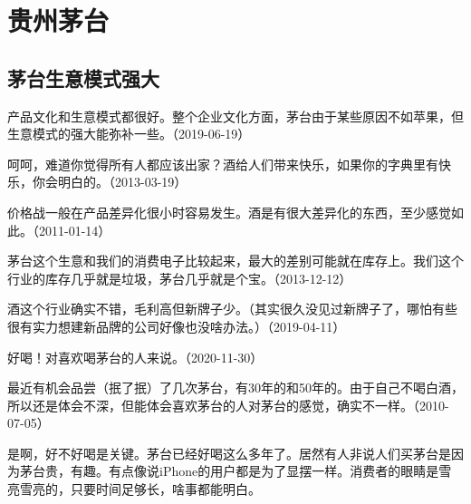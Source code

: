 
\section{贵州茅台}

\subsection{茅台生意模式强大}


产品文化和生意模式都很好。整个企业文化方面，茅台由于某些原因不如苹果，但生意模式的强大能弥补一些。（2019-06-19）


呵呵，难道你觉得所有人都应该出家？酒给人们带来快乐，如果你的字典里有快乐，你会明白的。（2013-03-19）

价格战一般在产品差异化很小时容易发生。酒是有很大差异化的东西，至少感觉如此。（2011-01-14）


茅台这个生意和我们的消费电子比较起来，最大的差别可能就在库存上。我们这个行业的库存几乎就是垃圾，茅台几乎就是个宝。（2013-12-12）


酒这个行业确实不错，毛利高但新牌子少。（其实很久没见过新牌子了，哪怕有些很有实力想建新品牌的公司好像也没啥办法。）（2019-04-11）


好喝！对喜欢喝茅台的人来说。（2020-11-30）

最近有机会品尝（抿了抿）了几次茅台，有30年的和50年的。由于自己不喝白酒，所以还是体会不深，但能体会喜欢茅台的人对茅台的感觉，确实不一样。（2010-07-05）


是啊，好不好喝是关键。茅台已经好喝这么多年了。居然有人非说人们买茅台是因为茅台贵，有趣。有点像说iPhone的用户都是为了显摆一样。消费者的眼睛是雪亮雪亮的，只要时间足够长，啥事都能明白。

